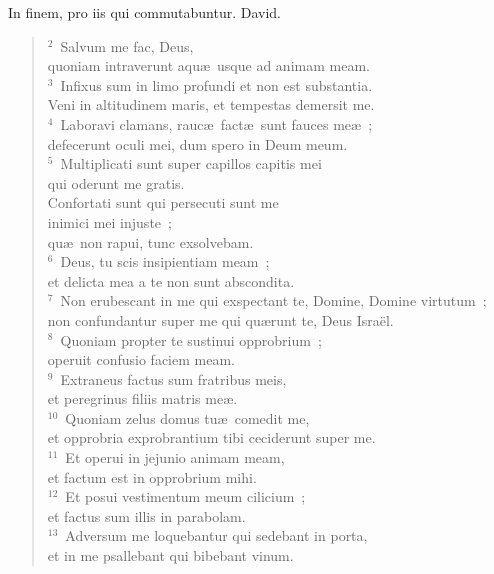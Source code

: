\lettrine[lines=3,image=true,loversize=0.05,lraise=-0.03]{I}{}n finem, pro iis qui commutabuntur. David.
\begin{flushleft}\begin{verse}\vspace{6pt}${}^{2}$~Salvum me fac, Deus,\\ quoniam intraverunt aqu\ae\ usque ad animam meam.\\
${}^{3}$~Infixus sum in limo profundi et non est substantia.\\ Veni in altitudinem maris, et tempestas demersit me.\\
${}^{4}$~Laboravi clamans, rauc\ae\ fact\ae\ sunt fauces me\ae~;\\ defecerunt oculi mei, dum spero in Deum meum.\\
${}^{5}$~Multiplicati sunt super capillos capitis mei\\ qui oderunt me gratis.\\ Confortati sunt qui persecuti sunt me\\ inimici mei injuste~;\\ qu\ae\ non rapui, tunc exsolvebam.\\
${}^{6}$~Deus, tu scis insipientiam meam~;\\ et delicta mea a te non sunt abscondita.\\
${}^{7}$~Non erubescant in me qui exspectant te, Domine, Domine virtutum~;\\ non confundantur super me qui qu\ae runt te, Deus Isra\"el.\\
${}^{8}$~Quoniam propter te sustinui opprobrium~;\\ operuit confusio faciem meam.\\
${}^{9}$~Extraneus factus sum fratribus meis,\\ et peregrinus filiis matris me\ae .\\
${}^{10}$~Quoniam zelus domus tu\ae\ comedit me,\\ et opprobria exprobrantium tibi ceciderunt super me.\\
${}^{11}$~Et operui in jejunio animam meam,\\ et factum est in opprobrium mihi.\\
${}^{12}$~Et posui vestimentum meum cilicium~;\\ et factus sum illis in parabolam.\\
${}^{13}$~Adversum me loquebantur qui sedebant in porta,\\ et in me psallebant qui bibebant vinum.\\

\end{verse}
\end{flushleft}
